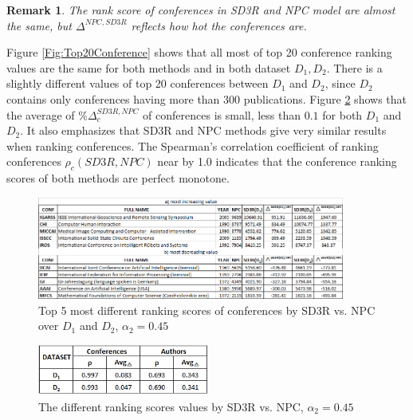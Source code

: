 \documentclass[10pt,leqno,twoside]{article}
\newtheorem{remark}{\indent Remark}[section]
\begin{document}
\begin{remark}
The rank score of conferences in SD3R and NPC model are almost the same, but $\Delta^{NPC,SD3R}$ reflects how hot the conferences are.
\end{remark}

Figure \ref{Fig:Top20Conference} shows that all most of top 20 conference ranking values are the same for both methods and in both dataset $D_1, D_2$. There is a slightly different values of top 20 conferences between $D_1$ and $D_2$, since $D_2$ contains only conferences having more than 300 publications.
Figure \ref{Fig:DeltaRho} shows that the average of $\%\Delta^{SD3R, NPC}_c$ of conferences is small, less than $0.1$ for both $D_1$ and $D_2$. It also emphasizes that SD3R and NPC methods give very similar results when ranking conferences.
The Spearman's correlation coefficient of ranking conferences $\rho_c(SD3R,NPC)$ near by 1.0 indicates that the conference ranking scores of both methods are perfect monotone.
%
\begin{figure} %
	\caption{Top 5 most different ranking scores of conferences by SD3R vs. NPC over $D_1$ and $D_2$, $\alpha_2=0.45$}
	\label{Fig:Top5Inc}
    \centering
    \includegraphics[width=0.9\textwidth]{Top5cInc}
\end{figure}
%
%
\begin{figure}
	\caption{The different ranking scores values by SD3R vs. NPC, $\alpha_2=0.45$}
	\label{Fig:DeltaRho}
    \centering
    \includegraphics[width=0.5\textwidth]{delta_rho}
\end{figure}
%
\end{document}
